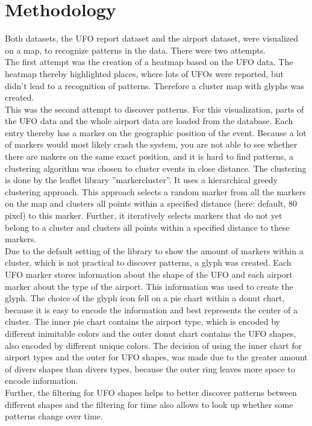 \documentclass{article}
\begin{document}
\section*{Methodology}
Both datasets, the UFO report dataset and the airport dataset, were visualized on a map, to recognize patterns in the data. There were two attempts.\\
The first attempt was the creation of a heatmap based on the UFO data. The heatmap thereby highlighted places, where lots of UFOs were reported, but didn't lead to a recognition of patterns. Therefore a cluster map with glyphs was created.\\
This was the second attempt to discover patterns. For this visualization, parts of the UFO data and the whole airport data are loaded from the database. Each entry thereby has a marker on the geographic position of the event.
Because a lot of markers would most likely crash the system, you are not able to see whether there are makers on the same exact position, and it is hard to find patterns, a clustering algorithm was chosen to cluster events in close distance. The clustering is done by the leaflet library ''markercluster''. It uses a hierarchical greedy clustering approach. This approach selects a random marker from all the markers on the map and clusters all points within a specified distance (here: default, 80 pixel) to this marker. Further, it iteratively selects markers that do not yet belong to a cluster and clusters all points within a specified distance to these markers.\\
Due to the default setting of the library to show the amount of markers within a cluster, which is not practical to discover patterns, a glyph was created. Each UFO marker stores information about the shape of the UFO and each airport marker about the type of the airport. This information was used to create the glyph. The choice of the glyph icon fell on a pie chart within a donut chart, because it is easy to encode the information and best represents the center of a cluster. The inner pie chart contains the airport type, which is encoded by different inimitable colors and the outer donut chart contains the UFO shapes, also encoded by different unique colors. The decision of using the inner chart for airport types and the outer for UFO shapes, was made due to the greater amount of divers shapes than divers types, because the outer ring leaves more space to encode information.\\
Further, the filtering for UFO shapes helps to better discover patterns between different shapes and the filtering for time also allows to look up whether some patterns change over time.\\
\end{document}
